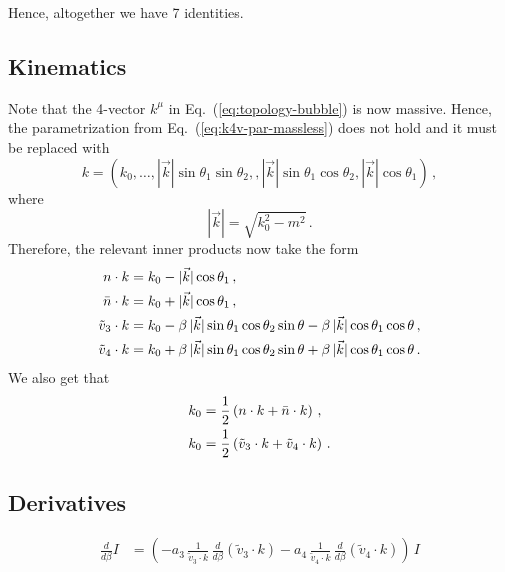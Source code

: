 \documentclass[a4paper,11pt]{report}
\numberwithin{equation}{section}
\begin{document}
Hence, altogether  we have  7 identities.

\subsection{Kinematics}
%
Note that the 4-vector $k^\mu$ in Eq.~(\ref{eq:topology-bubble}) is now massive.
Hence, the parametrization from Eq.~(\ref{eq:k4v-par-massless}) does not hold
and it must be replaced with 
%
\begin{equation}
 k  = 
 (k_0, \ldots,
 |\vec k| \sin\theta_1\sin\theta_2, ,|\vec k| \sin\theta_1\cos\theta_2,
 |\vec k| \cos\theta_1)\,,
 \label{eq:k4v-par-massive}
\end{equation}
%
where
%
\begin{equation}
 |\vec k| = \sqrt{k_0^2-m^2}\,.
\end{equation}
%
Therefore, the relevant inner products now take the form
%
\begin{align}
  n \cdot k & =  k_0 - |\vec k| \cos\theta_1\,, \\
  \bar{n} \cdot k & =  k_0 + |\vec k| \cos\theta_1\,, \\
  \tilde v_3 \cdot k & =  k_0- 
  \beta\, |\vec k| \sin\theta_1\cos\theta_2\sin\theta -
  \beta\, |\vec k| \cos\theta_1\cos\theta\,, \\
  \tilde v_4 \cdot k & =  k_0+
  \beta\, |\vec k|\sin\theta_1\cos\theta_2\sin\theta +
  \beta\, |\vec k|\cos\theta_1\cos\theta\,.
\end{align}
%
We also get that
%
\begin{align}
 k_0 & = \frac12\left(n\cdot k + \bar{n} \cdot k\right) \,, \\
 k_0 & = \frac12\left(\tilde v_3\cdot k + \tilde v_4 \cdot k\right)\,.
\end{align}

\subsection{Derivatives}

\begin{align}
  \frac{d}{d\beta} I & = 
  \left(
  - a_3\, \frac{1}{\tilde v_3 \cdot k}\, \frac{d}{d\beta}(\tilde v_3 \cdot k)  
  - a_4\, \frac{1}{\tilde v_4 \cdot k}\, \frac{d}{d\beta}(\tilde v_4 \cdot k)
  \right)\, I
\end{align}
\end{document}
